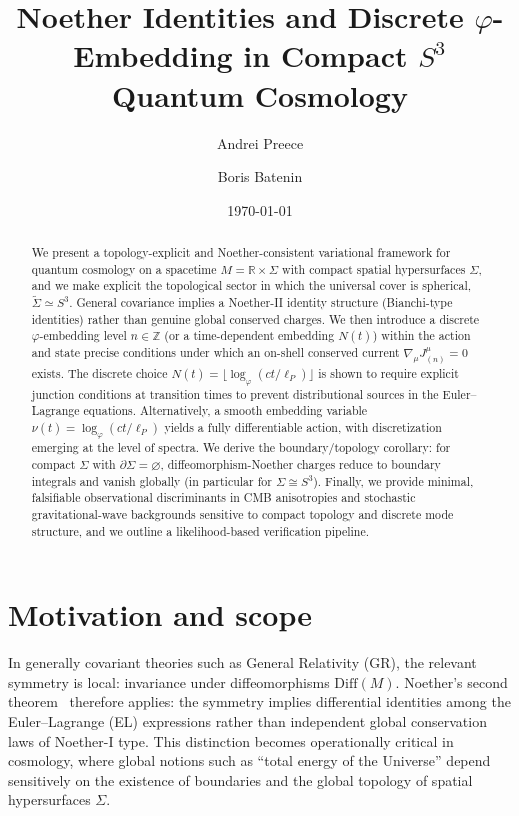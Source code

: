 \documentclass[
  reprint,
  amsmath,amssymb,
  aps,
  prd,
  superscriptaddress,
  nofootinbib,
  longbibliography
]{revtex4-2}
\newcommand{\phig}{\varphi}
\newcommand{\Sthree}{S^{3}}
\newcommand{\Sig}{\Sigma}
\newcommand{\Diff}{\mathrm{Diff}}
\newcommand{\RR}{\mathbb R}
\newcommand{\ZZ}{\mathbb Z}
\theoremstyle{definition}
\theoremstyle{remark}
\begin{document}
\title{Noether Identities and Discrete \texorpdfstring{$\varphi$}{phi}-Embedding in Compact \texorpdfstring{$S^{3}$}{S3} Quantum Cosmology}

\author{Andrei Preece}

\author{Boris Batenin}

\date{\today}
\begin{abstract}
We present a topology-explicit and Noether-consistent variational framework for quantum cosmology on
a spacetime $M=\RR\times \Sig$ with compact spatial hypersurfaces $\Sig$, and we make explicit the
topological sector in which the universal cover is spherical, $\widetilde{\Sig}\simeq \Sthree$.
General covariance implies a Noether-II identity structure (Bianchi-type
identities) rather than genuine global conserved charges. We then introduce a discrete $\phig$-embedding level
$n\in\ZZ$ (or a time-dependent embedding $N(t)$) within the action and state precise conditions under which an
on-shell conserved current $\nabla_\mu J^\mu_{(n)}=0$ exists. The discrete choice
$N(t)=\lfloor \log_{\phig}(ct/\ell_P)\rfloor$ is shown to require explicit junction conditions at transition times
to prevent distributional sources in the Euler--Lagrange equations. Alternatively, a smooth embedding variable
$\nu(t)=\log_{\phig}(ct/\ell_P)$ yields a fully differentiable action, with discretization emerging at the level
of spectra. We derive the boundary/topology corollary: for compact $\Sig$ with $\partial\Sig=\varnothing$,
diffeomorphism-Noether charges reduce to boundary integrals and vanish globally (in particular for
$\Sig\cong \Sthree$). Finally, we provide minimal,
falsifiable observational discriminants in CMB anisotropies and stochastic gravitational-wave backgrounds
sensitive to compact topology and discrete mode structure, and we outline a likelihood-based verification pipeline.
\end{abstract}

\maketitle

\section{Motivation and scope}
In generally covariant theories such as General Relativity (GR), the relevant symmetry is local:
invariance under diffeomorphisms $\Diff(M)$. Noether's second theorem~\cite{Noether1918} therefore applies: the symmetry implies
differential identities among the Euler--Lagrange (EL) expressions rather than independent global conservation
laws of Noether-I type. This distinction becomes operationally critical in cosmology, where global notions such as
``total energy of the Universe'' depend sensitively on the existence of boundaries and the global topology of
spatial hypersurfaces $\Sig$.
\end{document}

